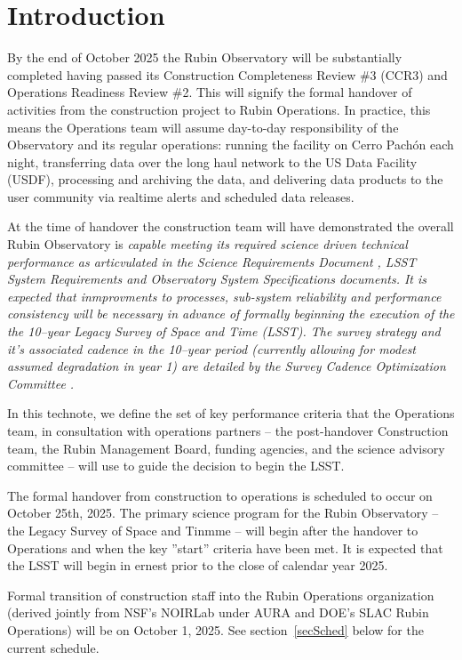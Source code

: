 \section{Introduction}

By the end of October 2025 the Rubin Observatory will be substantially completed having passed its Construction Completeness Review \#3 (CCR3) and Operations Readiness Review \#2.  This will signify the formal handover of activities from the construction project to Rubin Operations. In practice, this means the Operations team \cite[see][]{RDO-018} will assume day-to-day responsibility of the Observatory and its regular operations: running the facility on Cerro Pach\'{o}n each night, transferring data over the long haul network to the US Data Facility (USDF), processing and archiving the data, and delivering data products to the user community via realtime alerts and scheduled data releases. 

At the time of handover the construction team will have demonstrated the overall Rubin Observatory is \it{capable} meeting its required science driven technical performance as articvulated in the Science Requirements Document \cite{SRD}, LSST System Requirements \cite{LSR} and Observatory System Specifications \cite{OSS} documents.  It is expected that inmprovments to processes, sub-system reliability and performance consistency will be necessary in advance of formally beginning the execution of the the 10--year Legacy Survey of Space and Time (LSST). The survey strategy and it's associated cadence in the 10--year period (currently allowing for modest assumed degradation in year 1) are detailed by the Survey Cadence Optimization Committee \cite[SCOC,][]{PSTN-056}. 

In this technote, we define the set of key performance criteria that the Operations team, in consultation with operations partners -- the post-handover Construction team, the Rubin Management Board, funding agencies, and the science advisory committee -- will use to guide the decision to begin the LSST. 

The formal handover from construction to operations is scheduled to occur on October 25th, 2025. The primary science program for the Rubin Observatory -- the Legacy Survey of Space and Tinmme -- will begin after the handover to Operations and when the key ''start'' criteria have been met.  It is expected that the LSST will begin in ernest prior to the close of calendar year 2025.

Formal transition of construction staff into the Rubin Operations organization (derived jointly from NSF's NOIRLab under AURA and DOE's SLAC Rubin Operations) will be on October 1, 2025. See section~\ref{secSched} below for the current schedule.  
